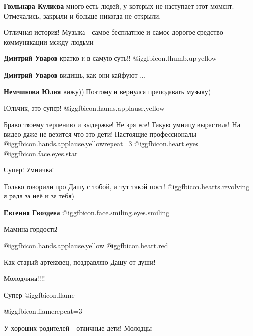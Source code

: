 \begin{itemize}
\begin{itemize}
\textbf{Гюльнара Кулиева} много есть людей, у которых не наступает этот момент. Отмечались, закрыли и больше никогда не открыли.
\end{itemize} %


Отличная история! Музыка - самое бесплатное и самое дорогое средство
коммуникации между людьми

\begin{itemize} %
\textbf{Дмитрий Уваров} кратко и в самую суть!!  @igg{fbicon.thumb.up.yellow} 

\textbf{Дмитрий Уваров} видишь, как они кайфуют ...

\textbf{Немчинова Юлия} вижу)) Поэтому и вернулся преподавать музыку)
\end{itemize} %

Юльчик, это супер!  @igg{fbicon.hands.applause.yellow} 

Браво твоему терпению и выдержке! Не зря все! Такую умницу вырастила! На видео
даже не верится что это дети! Настоящие профессионалы!  @igg{fbicon.hands.applause.yellow}{repeat=3}  @igg{fbicon.heart.eyes}  @igg{fbicon.face.eyes.star} 

Супер! Умничка!

Только говорили про Дашу с тобой, и тут такой пост!  @igg{fbicon.hearts.revolving} я рада за неё и за тебя)

\textbf{Евгения Гвоздева}  @igg{fbicon.face.smiling.eyes.smiling} 

Мамина гордость!


@igg{fbicon.hands.applause.yellow}  @igg{fbicon.heart.red}

Как старый артековец, поздравляю Дашу от души!

Молодчина!!!!

Супер  @igg{fbicon.flame} 

 @igg{fbicon.flame}{repeat=3} 

У хороших родителей - отличные дети! Молодцы


\end{itemize} %
